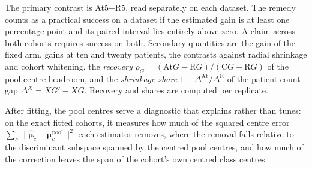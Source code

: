 \documentclass[11pt]{article}
\begin{document}
The primary contrast is At5$-$R5, read separately on each dataset. The remedy counts as a practical success on a dataset if the estimated gain is at least one percentage point and its paired interval lies entirely above zero. A claim across both cohorts requires success on both. Secondary quantities are the gain of the fixed arm, gains at ten and twenty patients, the contrasts against radial shrinkage and cohort whitening, the \emph{recovery} $\rho_G=(\mathrm{At}G-\mathrm RG)/(\mathrm CG-\mathrm RG)$ of the pool-centre headroom, and the \emph{shrinkage share} $1-\Delta^{\mathrm{At}}/\Delta^{\mathrm R}$ of the patient-count gap $\Delta^X=XG'-XG$. Recovery and shares are computed per replicate.

After fitting, the pool centres serve a diagnostic that explains rather than tunes: on the exact fitted cohorts, it measures how much of the squared centre error $\sum_c\lVert\hat{\boldsymbol\mu}_c-\boldsymbol\mu_c^{\mathrm{pool}}\rVert^2$ each estimator removes, where the removal falls relative to the discriminant subspace spanned by the centred pool centres, and how much of the correction leaves the span of the cohort's own centred class centres.





\end{document}
